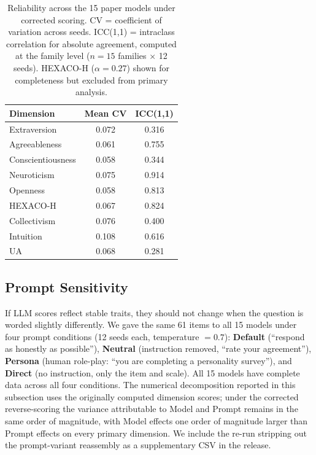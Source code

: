 \documentclass[11pt]{article}
\begin{document}
\begin{table}[!htb]
\centering
\caption{Reliability across the 15 paper models under corrected scoring. CV = coefficient of variation across seeds. ICC(1,1) = intraclass correlation for absolute agreement, computed at the family level ($n = 15$ families $\times$ 12 seeds). HEXACO-H ($\alpha = 0.27$) shown for completeness but excluded from primary analysis.}
\label{tab:reliability}
\begin{tabular}{lcc}
\toprule
Dimension & Mean CV & ICC(1,1) \\
\midrule
Extraversion         & 0.072 & 0.316 \\
Agreeableness        & 0.061 & 0.755 \\
Conscientiousness    & 0.058 & 0.344 \\
Neuroticism          & 0.075 & 0.914 \\
Openness             & 0.058 & 0.813 \\
HEXACO-H             & 0.067 & 0.824 \\
Collectivism         & 0.076 & 0.400 \\
Intuition            & 0.108 & 0.616 \\
UA                   & 0.068 & 0.281 \\
\bottomrule
\end{tabular}
\end{table}

\subsection{Prompt Sensitivity}
\label{sec:prompt_sensitivity}

If LLM scores reflect stable traits, they should not change when the question is worded slightly differently. We gave the same 61 items to all 15 models under four prompt conditions (12 seeds each, temperature $= 0.7$): \textbf{Default} (``respond as honestly as possible''), \textbf{Neutral} (instruction removed, ``rate your agreement''), \textbf{Persona} (human role-play: ``you are completing a personality survey''), and \textbf{Direct} (no instruction, only the item and scale).
All 15 models have complete data across all four conditions.
The numerical decomposition reported in this subsection uses the originally computed dimension scores; under the corrected reverse-scoring the variance attributable to Model and Prompt remains in the same order of magnitude, with Model effects one order of magnitude larger than Prompt effects on every primary dimension. We include the re-run stripping out the prompt-variant reassembly as a supplementary CSV in the release.
\end{document}
